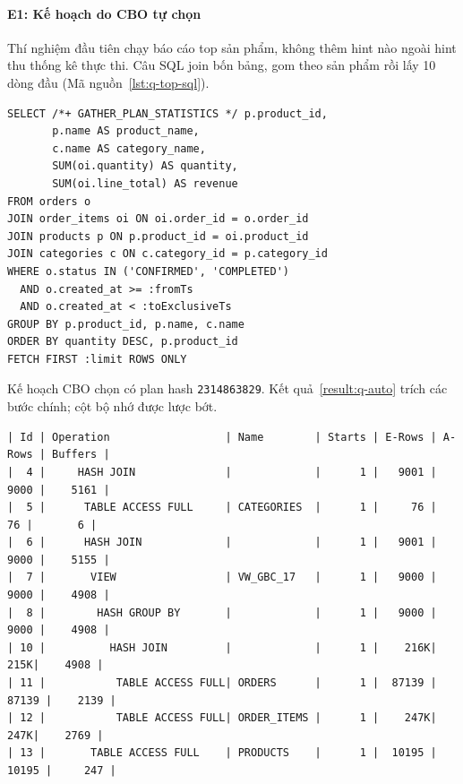 \paragraph{E1: Kế hoạch do CBO tự chọn}\label{sec:q-e1}

Thí nghiệm đầu tiên chạy báo cáo top sản phẩm, không thêm hint nào ngoài hint thu thống kê thực thi. Câu SQL join bốn bảng, gom theo sản phẩm rồi lấy 10 dòng đầu (Mã nguồn~\ref{lst:q-top-sql}).

\reportblockspace{72pt}
\begin{lstlisting}[language=OracleSQL,caption={Câu SQL của báo cáo top sản phẩm bán chạy.},label={lst:q-top-sql}]
SELECT /*+ GATHER_PLAN_STATISTICS */ p.product_id,
       p.name AS product_name,
       c.name AS category_name,
       SUM(oi.quantity) AS quantity,
       SUM(oi.line_total) AS revenue
FROM orders o
JOIN order_items oi ON oi.order_id = o.order_id
JOIN products p ON p.product_id = oi.product_id
JOIN categories c ON c.category_id = p.category_id
WHERE o.status IN ('CONFIRMED', 'COMPLETED')
  AND o.created_at >= :fromTs
  AND o.created_at < :toExclusiveTs
GROUP BY p.product_id, p.name, c.name
ORDER BY quantity DESC, p.product_id
FETCH FIRST :limit ROWS ONLY
\end{lstlisting}

Kế hoạch CBO chọn có plan hash \texttt{2314863829}. Kết quả~\ref{result:q-auto} trích các bước chính; cột bộ nhớ được lược bớt.

\reportblockspace{72pt}
\begingroup
{}\label{result:q-auto}
\nopagebreak[4]
\begin{Verbatim}[fontsize=\scriptsize]
| Id | Operation                  | Name        | Starts | E-Rows | A-Rows | Buffers |
|  4 |     HASH JOIN              |             |      1 |   9001 |   9000 |    5161 |
|  5 |      TABLE ACCESS FULL     | CATEGORIES  |      1 |     76 |     76 |       6 |
|  6 |      HASH JOIN             |             |      1 |   9001 |   9000 |    5155 |
|  7 |       VIEW                 | VW_GBC_17   |      1 |   9000 |   9000 |    4908 |
|  8 |        HASH GROUP BY       |             |      1 |   9000 |   9000 |    4908 |
| 10 |          HASH JOIN         |             |      1 |    216K|    215K|    4908 |
| 11 |           TABLE ACCESS FULL| ORDERS      |      1 |  87139 |  87139 |    2139 |
| 12 |           TABLE ACCESS FULL| ORDER_ITEMS |      1 |    247K|    247K|    2769 |
| 13 |       TABLE ACCESS FULL    | PRODUCTS    |      1 |  10195 |  10195 |     247 |
\end{Verbatim}
\endgroup\par\smallskip

